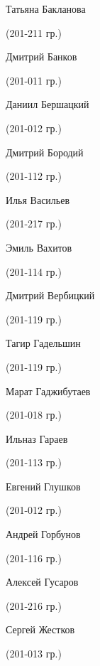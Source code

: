 \begin{multicols}{2}
\begin{small}
\begin{enumerate*}\itemsep1pt \parskip0pt 
	\item Татьяна Бакланова\begin{tiny} (201-211 гр.)\end{tiny}
	\item Дмитрий Банков\begin{tiny} (201-011 гр.)\end{tiny}
	\item Даниил Бершацкий\begin{tiny} (201-012 гр.)\end{tiny}
	\item Дмитрий Бородий\begin{tiny} (201-112 гр.)\end{tiny}
	\item Илья Васильев\begin{tiny} (201-217 гр.)\end{tiny}
	\item Эмиль Вахитов\begin{tiny} (201-114 гр.)\end{tiny}
	\item Дмитрий Вербицкий\begin{tiny} (201-119 гр.)\end{tiny}
	\item Тагир Гадельшин\begin{tiny} (201-119 гр.)\end{tiny}
	\item Марат Гаджибутаев\begin{tiny} (201-018 гр.)\end{tiny}
	\item Ильназ Гараев\begin{tiny} (201-113 гр.)\end{tiny}
	\item Евгений Глушков\begin{tiny} (201-012 гр.)\end{tiny}
	\item Андрей Горбунов\begin{tiny} (201-116 гр.)\end{tiny}
	\item Алексей Гусаров\begin{tiny} (201-216 гр.)\end{tiny}
	\item Сергей Жестков\begin{tiny} (201-013 гр.)\end{tiny}

\end{enumerate*}
\end{small}
\end{multicols}
